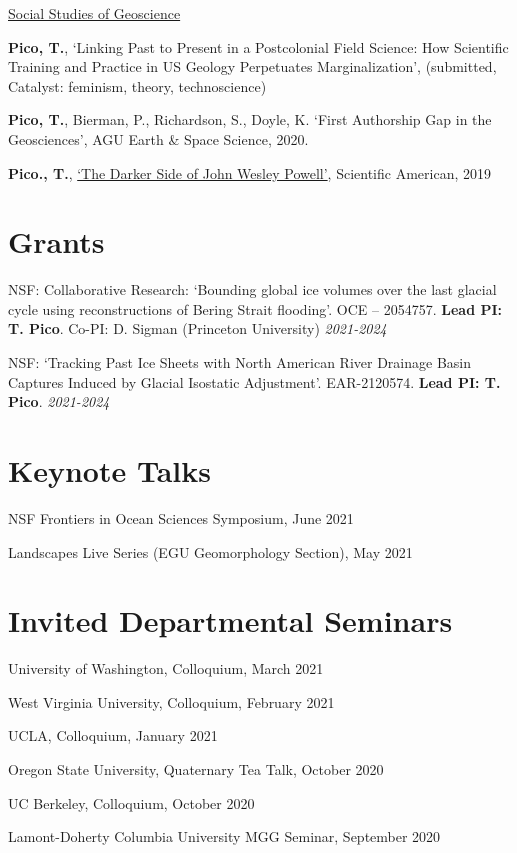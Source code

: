 \documentclass[margin,line]{res}
\begin{document}
\begin{resume}
{ {\sc \underline{Social Studies of Geoscience} }}

{\bf Pico, T.}, `Linking Past to Present in a Postcolonial Field Science: How Scientific Training and Practice in US Geology Perpetuates Marginalization', (submitted, Catalyst: feminism, theory, technoscience)

{\bf Pico, T.}, Bierman, P., Richardson, S., Doyle, K. `First Authorship Gap in the Geosciences',  AGU Earth \& Space Science, 2020.

{\bf Pico., T.}, \href{https://blogs.scientificamerican.com/voices/the-darker-side-of-john-wesley-powell/}{`The Darker Side of John Wesley Powell'}, Scientific American, 2019

\section{\sc Grants}

NSF: Collaborative Research: `Bounding global ice volumes over the last glacial cycle using reconstructions of Bering Strait flooding'. OCE – 2054757. {\bf Lead PI: T. Pico}. Co-PI: D. Sigman (Princeton University)    \hfill {\em  2021-2024}

NSF: `Tracking Past Ice Sheets with North American River Drainage Basin Captures Induced by Glacial Isostatic Adjustment'. EAR-2120574.  {\bf Lead PI: T. Pico}.  \hfill {\em  2021-2024}

\section{\sc Keynote Talks}

NSF Frontiers in Ocean Sciences Symposium, June 2021

Landscapes Live Series (EGU Geomorphology Section),  May 2021

\section{\sc Invited Departmental Seminars}

University of Washington, Colloquium, March 2021

West Virginia University, Colloquium, February 2021

UCLA, Colloquium, January 2021

Oregon State University, Quaternary Tea Talk, October 2020

UC Berkeley, Colloquium, October 2020

Lamont-Doherty Columbia University MGG Seminar, September 2020


\end{resume}
\end{document}
